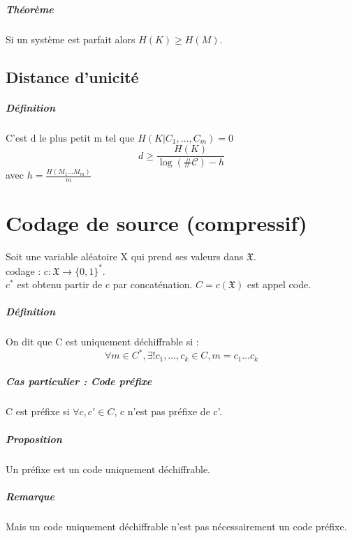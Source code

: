 \documentclass[12pt,a4paper]{report}
\begin{document}
\paragraph{Théorème\\}
Si un système est parfait alors $H(K) \geqslant H(M) $.
\section{Distance d'unicité}
\paragraph{Définition\\}
C'est d le plus petit m tel que $H(K|C_1,\ldots,C_m)=0$
$$ d \geqslant \frac{H(K)}{\log(\#\mathcal{C})-h} $$
avec $ h = \displaystyle\frac{H(M_1\ldots M_m)}{m} $

\chapter{Codage de source (compressif)}
Soit une variable aléatoire X qui prend ses valeurs dans $ \mathfrak{X}  $.\\
codage : $ c:\mathfrak{X} \longrightarrow \{0,1\}^* $.\\
$c^*$ est obtenu  partir de c par concaténation. $C=c(\mathfrak{X})$ est appel code.
\paragraph{Définition\\}
On dit que C est uniquement déchiffrable si : $$ \forall m \in C^*,\exists ! c_1,\ldots,c_k \in C, m=c_1\ldots c_k $$
\paragraph{Cas particulier : Code préfixe\\} 
C est préfixe si $ \forall c,c' \in C $, c n'est pas préfixe de c'.
\paragraph{Proposition\\}
Un préfixe est un code uniquement déchiffrable.
\paragraph{Remarque\\}
Mais un code uniquement déchiffrable n'est pas nécessairement un code préfixe.
\end{document}
